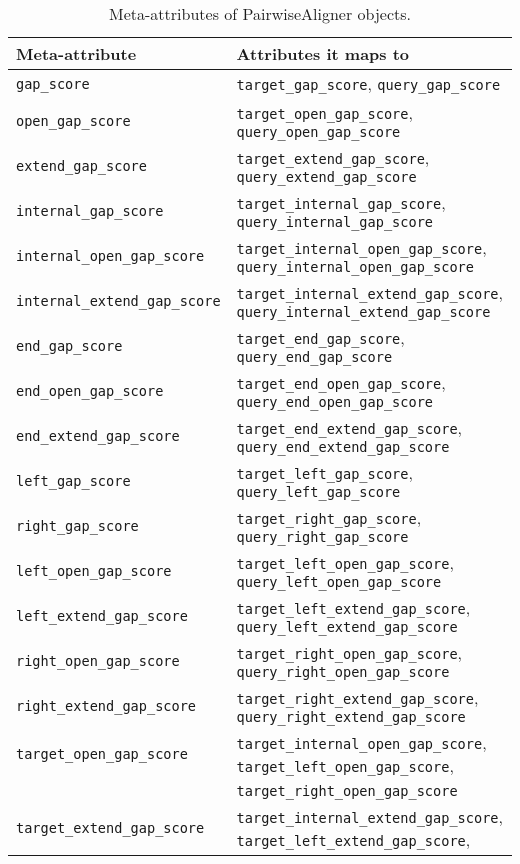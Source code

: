 \begin{table}
\caption{Meta-attributes of PairwiseAligner objects.}
\begin{tabular}{|l|l|}
\hline
\textbf{Meta-attribute} & \textbf{Attributes it maps to} \\
\hline
\verb+gap_score+ & \verb+target_gap_score+, \verb+query_gap_score+ \\
\verb+open_gap_score+ & \verb+target_open_gap_score+, \verb+query_open_gap_score+ \\
\verb+extend_gap_score+ & \verb+target_extend_gap_score+, \verb+query_extend_gap_score+ \\
\verb+internal_gap_score+ & \verb+target_internal_gap_score+, \verb+query_internal_gap_score+ \\
\verb+internal_open_gap_score+ & \verb+target_internal_open_gap_score+, \verb+query_internal_open_gap_score+ \\
\verb+internal_extend_gap_score+ & \verb+target_internal_extend_gap_score+, \verb+query_internal_extend_gap_score+ \\
\verb+end_gap_score+ & \verb+target_end_gap_score+, \verb+query_end_gap_score+ \\
\verb+end_open_gap_score+ & \verb+target_end_open_gap_score+, \verb+query_end_open_gap_score+ \\
\verb+end_extend_gap_score+ & \verb+target_end_extend_gap_score+, \verb+query_end_extend_gap_score+ \\
\verb+left_gap_score+ & \verb+target_left_gap_score+, \verb+query_left_gap_score+ \\
\verb+right_gap_score+ & \verb+target_right_gap_score+, \verb+query_right_gap_score+ \\
\verb+left_open_gap_score+ & \verb+target_left_open_gap_score+, \verb+query_left_open_gap_score+ \\
\verb+left_extend_gap_score+ & \verb+target_left_extend_gap_score+, \verb+query_left_extend_gap_score+ \\
\verb+right_open_gap_score+ & \verb+target_right_open_gap_score+, \verb+query_right_open_gap_score+ \\
\verb+right_extend_gap_score+ & \verb+target_right_extend_gap_score+, \verb+query_right_extend_gap_score+ \\
\verb+target_open_gap_score+ & \verb+target_internal_open_gap_score+, \verb+target_left_open_gap_score+, \\
                             & \verb+target_right_open_gap_score+ \\
\verb+target_extend_gap_score+ & \verb+target_internal_extend_gap_score+, \verb+target_left_extend_gap_score+, \\

\end{tabular}
\end{table}
